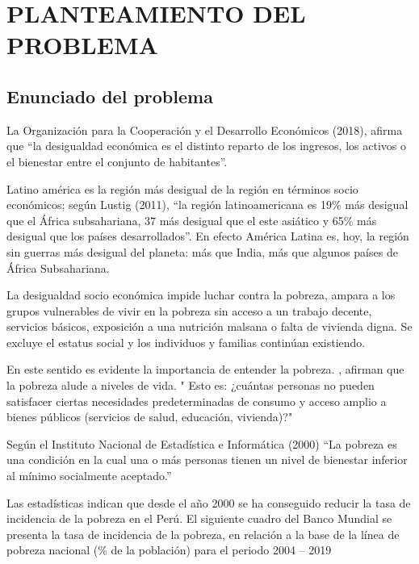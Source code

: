 \section{\large PLANTEAMIENTO DEL PROBLEMA}
	
	\subsection{Enunciado del problema}

La Organización para la Cooperación y el Desarrollo Económicos (2018), afirma que “la desigualdad económica es el distinto reparto de los ingresos, los activos o el bienestar entre el conjunto de habitantes”.

Latino américa es la región más desigual de la región en términos socio económicos; según Lustig (2011), “la región latinoamericana es 19\% más desigual que el África subsahariana, 37 más desigual que el este asiático y 65\% más desigual que los países desarrollados”.  En efecto América Latina es, hoy, la región sin guerras más desigual del planeta: más que India, más que algunos países de África Subsahariana.

La desigualdad socio económica impide luchar contra la pobreza, ampara a los grupos vulnerables de vivir en la pobreza sin acceso a un trabajo decente, servicios básicos, exposición a una nutrición malsana o falta de vivienda digna. Se excluye el estatus social y los individuos y familias continúan existiendo.

En este sentido es evidente la importancia de entender la pobreza. \cite{Ravallion1991}, afirman que la pobreza alude a niveles de vida.  " Esto es: ¿cuántas personas no pueden satisfacer ciertas necesidades predeterminadas de consumo y acceso amplio a bienes públicos (servicios de salud, educación, vivienda)?" 

Según el Instituto Nacional de Estadística e Informática (2000) “La pobreza es una condición en la cual una o más personas tienen un nivel de bienestar inferior al mínimo socialmente aceptado.” 

Las estadísticas indican que desde el año 2000 se ha conseguido reducir la tasa de incidencia de la pobreza en el Perú.
El siguiente cuadro del Banco Mundial se presenta la tasa de incidencia de la pobreza, en relación a la base de la línea de pobreza nacional (\% de la población) para el periodo 2004 – 2019

